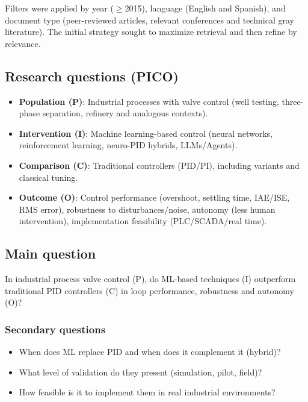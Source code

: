 \documentclass{article}
\begin{document}
Filters were applied by year ($\geq$2015), language (English and Spanish), and document type (peer-reviewed articles, relevant conferences and technical gray literature).
The initial strategy sought to maximize retrieval and then refine by relevance.

\subsection{Research questions (PICO)}

\begin{itemize}
  \item \textbf{Population (P)}: Industrial processes with valve control (well testing, three-phase separation, refinery and analogous contexts).
  \item \textbf{Intervention (I)}: Machine learning-based control (neural networks, reinforcement learning, neuro-PID hybrids, LLMs/Agents).
  \item \textbf{Comparison (C)}: Traditional controllers (PID/PI), including variants and classical tuning.
  \item \textbf{Outcome (O)}: Control performance (overshoot, settling time, IAE/ISE, RMS error), robustness to disturbances/noise, autonomy (less human intervention), implementation feasibility (PLC/SCADA/real time).
\end{itemize}

\subsection{Main question}

In industrial process valve control (P), do ML-based techniques (I) outperform traditional PID controllers (C) in loop performance, robustness and autonomy (O)?

\subsubsection{Secondary questions}

\begin{itemize}
  \item When does ML replace PID and when does it complement it (hybrid)?
  \item What level of validation do they present (simulation, pilot, field)?
  \item How feasible is it to implement them in real industrial environments?
\end{itemize}
\end{document}
